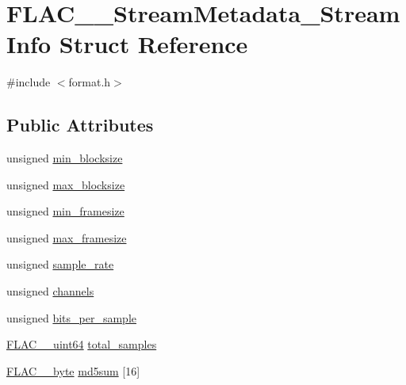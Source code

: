 \hypertarget{struct_f_l_a_c_____stream_metadata___stream_info}{}\section{F\+L\+A\+C\+\_\+\+\_\+\+Stream\+Metadata\+\_\+\+Stream\+Info Struct Reference}
\label{struct_f_l_a_c_____stream_metadata___stream_info}


{\ttfamily \#include $<$format.\+h$>$}

\subsection*{Public Attributes}
\begin{DoxyCompactItemize}
\item 
unsigned \hyperlink{struct_f_l_a_c_____stream_metadata___stream_info_ad999bb6f695206464df8d76126812572}{min\+\_\+blocksize}
\item 
unsigned \hyperlink{struct_f_l_a_c_____stream_metadata___stream_info_a0eda0a30574e0b51716f34c6a90912dc}{max\+\_\+blocksize}
\item 
unsigned \hyperlink{struct_f_l_a_c_____stream_metadata___stream_info_a4f9408c082ef8bb4f14a8da6e8e24fd4}{min\+\_\+framesize}
\item 
unsigned \hyperlink{struct_f_l_a_c_____stream_metadata___stream_info_a89e04506e5030310582fed83b9a36022}{max\+\_\+framesize}
\item 
unsigned \hyperlink{struct_f_l_a_c_____stream_metadata___stream_info_a127c95ed9ea6564191f57a1642e27c97}{sample\+\_\+rate}
\item 
unsigned \hyperlink{struct_f_l_a_c_____stream_metadata___stream_info_a13bf6f8e5bdaa2dff48c29c7aff4ef88}{channels}
\item 
unsigned \hyperlink{struct_f_l_a_c_____stream_metadata___stream_info_af8886c928641f6dcc242652adf4e1bc9}{bits\+\_\+per\+\_\+sample}
\item 
\hyperlink{ordinals_8h_aa78c8c70a3eb8a58af7436f278acde8e}{F\+L\+A\+C\+\_\+\+\_\+uint64} \hyperlink{struct_f_l_a_c_____stream_metadata___stream_info_a23d6f6769cb9bbf052a3a4f592f2e383}{total\+\_\+samples}
\item 
\hyperlink{ordinals_8h_a5eb569b12d5b047cdacada4d57924ee3}{F\+L\+A\+C\+\_\+\+\_\+byte} \hyperlink{struct_f_l_a_c_____stream_metadata___stream_info_ac9cd72dc89ed697f78e8521fb69d232f}{md5sum} \mbox{[}16\mbox{]}
\end{DoxyCompactItemize}


